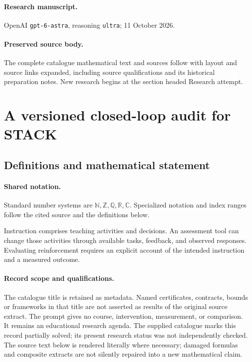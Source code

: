 \documentclass[11pt]{article}
\begin{document}
\paragraph{Research manuscript.} OpenAI \texttt{gpt-6-astra}, reasoning \texttt{ultra}; 11 October 2026.
\paragraph{Preserved source body.} The complete catalogue mathematical text and sources follow with layout and source links expanded, including source qualifications and its historical preparation notes. New research begins at the section headed Research attempt.

\section{A versioned closed-loop audit for STACK}\label{statement}

\subsection{Definitions and mathematical statement}

\paragraph{Shared notation.}Standard number systems are $\mathbb N,\mathbb Z,\mathbb Q,\mathbb R,\mathbb C$. Specialized notation and index ranges follow the cited source and the definitions below.


Instruction comprises teaching activities and decisions. An assessment tool can change those activities through available tasks, feedback, and observed responses. Evaluating reinforcement requires an explicit account of the intended instruction and a measured outcome.
\paragraph{Record scope and qualifications.}
The catalogue title is retained as metadata. Named certificates, contracts, bounds or frameworks in that title are not asserted as results of the original source extract.
The prompt gives no course, intervention, measurement, or comparison. It remains an educational research agenda. The supplied catalogue marks this record partially solved; its present research status was not independently checked.
The source text below is rendered literally where necessary; damaged formulas and composite extracts are not silently repaired into a new mathematical claim.
\end{document}
